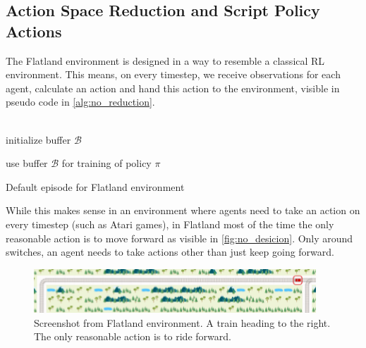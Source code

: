 \subsection*{Action Space Reduction and Script Policy Actions}\label{reduced_action_space}
The Flatland environment is designed in a way to resemble a classical RL environment. This means, on every timestep, we receive observations for each agent, calculate an action and hand this action to the environment, visible in pseudo code in \autoref{alg:no_reduction}.\\\\
\begin{algorithm}[H]
	initialize buffer $\mathcal{B}$\\

	use buffer $\mathcal{B}$ for training of policy $\pi$
	\caption{Default episode for Flatland environment}
	\label{alg:no_reduction}
\end{algorithm}
While this makes sense in an environment where agents need to take an action on every timestep (such as Atari games), in Flatland most of the time the only reasonable action is to move forward as visible in \autoref{fig:no_desicion}. Only around switches, an agent needs to take actions other than just keep going forward.
\begin{figure}[H]
	\centering
	\includegraphics[width=300pt]{images/screenshot_no_decision.png}
	\caption{Screenshot from Flatland environment. A train heading to the right. The only reasonable action is to ride forward.}
	\label{fig:no_desicion}
\end{figure}
